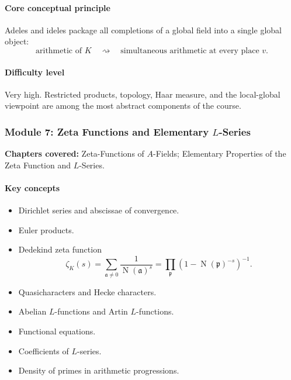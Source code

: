 \documentclass[11pt]{article}
\newcommand{\Norm}{\operatorname{N}}
\begin{document}
\paragraph{Core conceptual principle}
Adeles and ideles package all completions of a global field into a single global object:
\[
\text{arithmetic of }K
\quad\rightsquigarrow\quad
\text{simultaneous arithmetic at every place }v.
\]

\paragraph{Difficulty level}
Very high. Restricted products, topology, Haar measure, and the local-global viewpoint are among the most abstract components of the course.

\subsubsection*{Module 7: Zeta Functions and Elementary $L$-Series}

\textbf{Chapters covered:} Zeta-Functions of $A$-Fields; Elementary Properties of the Zeta Function and $L$-Series.

\paragraph{Key concepts}
\begin{itemize}
    \item Dirichlet series and abscissae of convergence.
    \item Euler products.
    \item Dedekind zeta function
    \[
    \zeta_K(s)=\sum_{\mathfrak{a}\neq 0}\frac{1}{\Norm(\mathfrak{a})^s}
    =\prod_{\mathfrak{p}}\left(1-\Norm(\mathfrak{p})^{-s}\right)^{-1}.
    \]
    \item Quasicharacters and Hecke characters.
    \item Abelian $L$-functions and Artin $L$-functions.
    \item Functional equations.
    \item Coefficients of $L$-series.
    \item Density of primes in arithmetic progressions.
\end{itemize}
\end{document}
